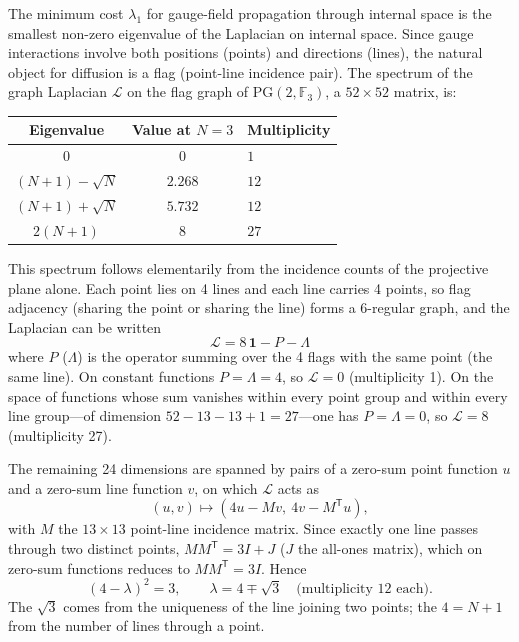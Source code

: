 \documentclass[12pt,a4paper]{article}
\begin{document}
The minimum cost $\lambda_1$ for gauge-field propagation through
internal space is the smallest non-zero eigenvalue of the Laplacian
on internal space.
Since gauge interactions involve both positions (points) and
directions (lines), the natural object for diffusion is a
flag (point-line incidence pair).
The spectrum of the graph Laplacian $\mathcal{L}$ on the flag graph of
$\mathrm{PG}(2,\mathbb{F}_3)$, a $52 \times 52$ matrix, is:
\begin{center}\small
\begin{tabular}{ccl}
\toprule
Eigenvalue & Value at $N=3$ & Multiplicity \\
\midrule
$0$ & $0$ & $1$ \\
$(N{+}1) - \sqrt{N}$ & $2.268$ & $12$ \\
$(N{+}1) + \sqrt{N}$ & $5.732$ & $12$ \\
$2(N{+}1)$ & $8$ & $27$ \\
\bottomrule
\end{tabular}
\end{center}
\noindent
This spectrum follows elementarily from the incidence counts of the projective plane alone. Each point lies on 4 lines and each line carries 4 points, so flag adjacency (sharing the point or sharing the line) forms a 6-regular graph, and the Laplacian can be written
\[\mathcal{L} = 8\,\mathbf{1} - P - \Lambda\]
where $P$ ($\Lambda$) is the operator summing over the 4 flags with the same point (the same line). On constant functions $P = \Lambda = 4$, so $\mathcal{L} = 0$ (multiplicity 1). On the space of functions whose sum vanishes within every point group and within every line group---of dimension $52 - 13 - 13 + 1 = 27$---one has $P = \Lambda = 0$, so $\mathcal{L} = 8$ (multiplicity 27).

The remaining 24 dimensions are spanned by pairs of a zero-sum point function $u$ and a zero-sum line function $v$, on which $\mathcal{L}$ acts as
\begin{equation}
  (u, v) \mapsto (4u - Mv,\ 4v - M^{\mathsf T}u),
\end{equation}
with $M$ the $13 \times 13$ point-line incidence matrix. Since exactly one line passes through two distinct points, $M M^{\mathsf T} = 3I + J$ ($J$ the all-ones matrix), which on zero-sum functions reduces to $M M^{\mathsf T} = 3I$. Hence
\begin{equation}
  (4-\lambda)^2 = 3,\qquad \lambda = 4 \mp \sqrt{3}\quad\text{(multiplicity 12 each)}.
\end{equation} The $\sqrt3$ comes from the uniqueness of the line joining two points; the $4 = N + 1$ from the number of lines through a point.
\end{document}
